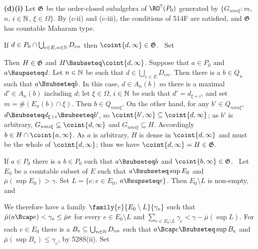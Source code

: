 {{\bf (d)(i)} Let $\frak G$ be the order-closed subalgebra of
$\RO^{\uparrow}(P_0)$ generated by
$\{G_{nmi\xi}:m$, $n$, $i\in\Bbb N$, $\xi\in\Omega\}$.
By (c-ii) and (c-iii), the conditions of 514F
are satisfied, and $\frak G$ has countable Maharam type.

\medskip

 If $d\in P_0\cap\bigcup_{e\in E,n\in\Bbb N}D_{en}$ then
$\coint{d,\infty}\in\frak G$.   \Prf\ Set


\noindent Then $H\in\frak G$ and $H\Bsubseteq\coint{d,\infty}$.
Suppose that $a\in P_0$ and $a\Bsupseteq d$.
Let $n\in\Bbb N$ be such that $d\in\bigcup_{e\in E}D_{en}$.
Then there is a $b\in Q_n$
such that $a\Bsubseteq b$.   In this case, $d\in A_n(b)$ so there is a
maximal $d'\in A_n(b)$ including $d$;  let $\xi\in\Omega$,
$i\in\Bbb N$ be such that
$d'=d_{\xi+i}$, and set $m=\#(E_n(b)\cap\xi)$.   Then $b\in Q_{nmi\xi}$.
On the other hand, for any
$b'\in Q_{nmi\xi}$, $d\Bsubseteq d_{\xi+i}\Bsubseteq b'$, so
$\coint{b',\infty}\subseteq\coint{d,\infty}$;  as
$b'$ is arbitrary, $G_{nmi\xi}\subseteq\coint{d,\infty}$ and
$G_{nmi\xi}\subseteq H$.   Accordingly $b\in H\cap\coint{a,\infty}$.
As $a$ is arbitrary, $H$ is dense in $\coint{d,\infty}$ and must be the
whole of $\coint{d,\infty}$;  thus we have $\coint{d,\infty}=H\in\frak G$.\
\Qed

\medskip

 If $a\in P_0$ there is a $b\in P_0$ such that
$a\Bsubseteq b$ and $\coint{b,\infty}\in\frak G$.   \Prf\ Let $E_0$ be a
countable subset of $E$ such that $a\Bsubseteq\sup E_0$ and
$\bar\mu(\sup E_0)>\gamma$.
Set $L=\{e:e\in E_0$, $a\Bsupseteq e\}$.   Then $E_0\setminus L$ is
non-empty, and


\noindent We therefore have a family
$\family{e}{E_0\setminus L}{\gamma_e}$ such that
$\bar\mu(a\Bcap e)<\gamma_e\le\bar\mu e$ for every $e\in E_0\setminus L$
and $\sum_{e\in E_0\setminus L}\gamma_e<\gamma-\bar\mu(\sup L)$.
For each $e\in E_0$ there is a $B_e\subseteq\bigcup_{n\in\Bbb N}D_{en}$
such that $a\Bcap e\Bsubseteq\sup B_e$ and $\bar\mu(\sup B_e)\le\gamma_e$,
by 528S(ii).   Set


}
